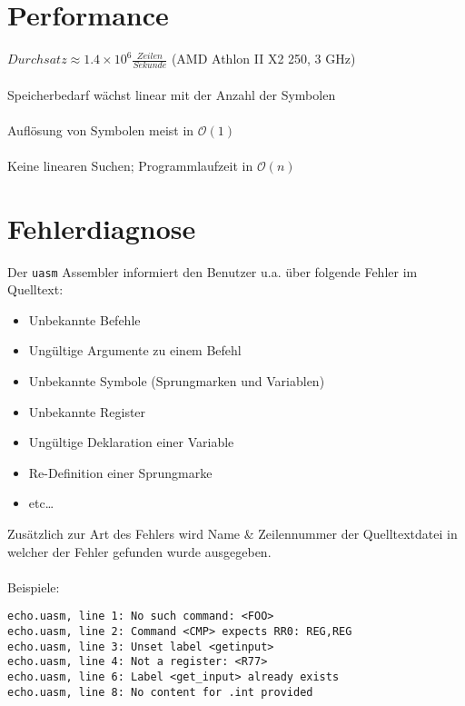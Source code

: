 \section{Performance}

\begin{frame}[fragile]{\insertsection}
    $Durchsatz \approx 1.4 \times 10^6 \frac{Zeilen}{Sekunde}$
    (AMD Athlon II X2 250, 3 GHz) \\~\\
    Speicherbedarf wächst linear mit der Anzahl der Symbolen \\~\\
    Auflösung von Symbolen meist in $\mathcal{O}(1)$ \\~\\
    Keine linearen Suchen; Programmlaufzeit in $\mathcal{O}(n)$
\end{frame}

\section{Fehlerdiagnose}

\begin{frame}{\insertsection}
    Der \texttt{uasm} Assembler informiert den Benutzer u.a. über folgende
    Fehler im Quelltext:
    \begin{itemize}
        \item Unbekannte Befehle
        \item Ungültige Argumente zu einem Befehl
        \item Unbekannte Symbole (Sprungmarken und Variablen)
        \item Unbekannte Register
        \item Ungültige Deklaration einer Variable
        \item Re-Definition einer Sprungmarke
        \item etc\ldots{}
    \end{itemize}
\end{frame}

\begin{frame}[fragile]{\insertsection}
    Zusätzlich zur Art des Fehlers wird Name \& Zeilennummer der Quelltextdatei
    in welcher der Fehler gefunden wurde ausgegeben.\\~\\
    Beispiele:
\begin{verbatim}
echo.uasm, line 1: No such command: <FOO>
echo.uasm, line 2: Command <CMP> expects RR0: REG,REG
echo.uasm, line 3: Unset label <getinput>
echo.uasm, line 4: Not a register: <R77>
echo.uasm, line 6: Label <get_input> already exists
echo.uasm, line 8: No content for .int provided
\end{verbatim}
\end{frame}

